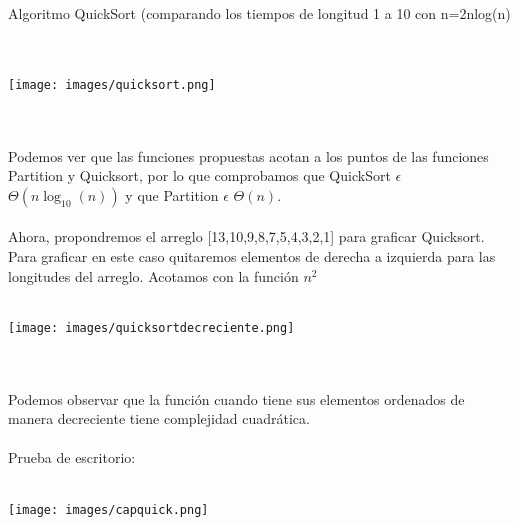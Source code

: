 \documentclass[12pt,twoside]{article}
\begin{document}
Algoritmo QuickSort (comparando los tiempos de longitud 1 a 10 con n=2nlog(n)\\\\\
\centerline{\texttt{[image: images/quicksort.png]}}\\\\
Podemos ver que las funciones propuestas acotan a los puntos de las funciones Partition y Quicksort, por lo que comprobamos que QuickSort $\epsilon$ $\Theta(n\log_{10}(n))$ y que Partition $\epsilon$ $\Theta(n)$.\\\\
Ahora, propondremos el arreglo [13,10,9,8,7,5,4,3,2,1] para graficar Quicksort. Para graficar en este caso quitaremos elementos de derecha a izquierda para las longitudes del arreglo. Acotamos con la funci\'on $n^{2}$\\\\
\centerline{\texttt{[image: images/quicksortdecreciente.png]}}\\\\
Podemos observar que la función cuando tiene sus elementos ordenados de manera decreciente tiene complejidad cuadr\'atica.\\\\\newpage
Prueba de escritorio:\\\\
\centerline{\texttt{[image: images/capquick.png]}}\\\\
\end{document}
